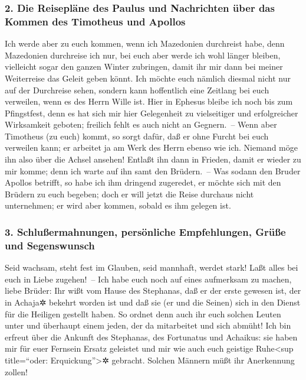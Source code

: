 \hypertarget{die-reisepluxe4ne-des-paulus-und-nachrichten-uxfcber-das-kommen-des-timotheus-und-apollos}{%
\subsubsection{2. Die Reisepläne des Paulus und Nachrichten über das
Kommen des Timotheus und
Apollos}\label{die-reisepluxe4ne-des-paulus-und-nachrichten-uxfcber-das-kommen-des-timotheus-und-apollos}}

 Ich werde aber zu euch kommen, wenn ich Mazedonien
durchreist habe, denn Mazedonien durchreise ich nur,  bei
euch aber werde ich wohl länger bleiben, vielleicht sogar den ganzen
Winter zubringen, damit ihr mir dann bei meiner Weiterreise das Geleit
geben könnt.  Ich möchte euch nämlich diesmal nicht nur
auf der Durchreise sehen, sondern kann hoffentlich eine Zeitlang bei
euch verweilen, wenn es des Herrn Wille ist.  Hier in
Ephesus bleibe ich noch bis zum Pfingstfest,  denn es hat
sich mir hier Gelegenheit zu vielseitiger und erfolgreicher Wirksamkeit
geboten; freilich fehlt es auch nicht an Gegnern.~-- 
Wenn aber Timotheus (zu euch) kommt, so sorgt dafür, daß er ohne Furcht
bei euch verweilen kann; er arbeitet ja am Werk des Herrn ebenso wie
ich.  Niemand möge ihn also über die Achsel ansehen!
Entlaßt ihn dann in Frieden, damit er wieder zu mir komme; denn ich
warte auf ihn samt den Brüdern.~--  Was sodann den Bruder
Apollos betrifft, so habe ich ihm dringend zugeredet, er möchte sich mit
den Brüdern zu euch begeben; doch er will jetzt die Reise durchaus nicht
unternehmen; er wird aber kommen, sobald es ihm gelegen ist.

\hypertarget{schluuxdfermahnungen-persuxf6nliche-empfehlungen-gruxfcuxdfe-und-segenswunsch}{%
\subsubsection{3. Schlußermahnungen, persönliche Empfehlungen, Grüße und
Segenswunsch}\label{schluuxdfermahnungen-persuxf6nliche-empfehlungen-gruxfcuxdfe-und-segenswunsch}}

 Seid wachsam, steht fest im Glauben, seid mannhaft,
werdet stark!  Laßt alles bei euch in Liebe zugehen!~--
 Ich habe euch noch auf eines aufmerksam zu machen, liebe
Brüder: Ihr wißt vom Hause des Stephanas, daß er der erste gewesen ist,
der in Achaja✲ bekehrt worden ist und daß sie (er und die Seinen) sich
in den Dienst für die Heiligen gestellt haben.  So ordnet
denn auch ihr euch solchen Leuten unter und überhaupt einem jeden, der
da mitarbeitet und sich abmüht!  Ich bin erfreut über die
Ankunft des Stephanas, des Fortunatus und Achaikus: sie haben mir für
euer Fernsein Ersatz geleistet  und mir wie auch euch
geistige Ruhe\textless sup title=``oder: Erquickung''\textgreater✲
gebracht. Solchen Männern müßt ihr Anerkennung zollen!

